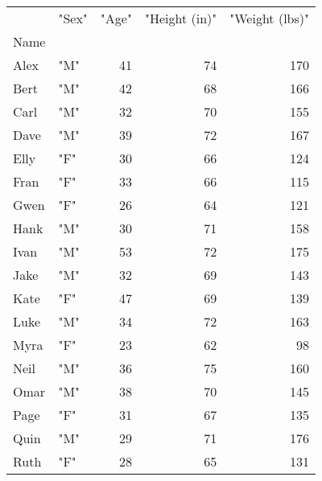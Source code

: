 \begin{tabular}{llrrr}
 &      "Sex" &  "Age" &  "Height (in)" &  "Weight (lbs)" \\
Name &  &  &  &  \\
Alex &        "M" & 41 & 74 & 170 \\
Bert &        "M" & 42 & 68 & 166 \\
Carl &        "M" & 32 & 70 & 155 \\
Dave &        "M" & 39 & 72 & 167 \\
Elly &        "F" & 30 & 66 & 124 \\
Fran &        "F" & 33 & 66 & 115 \\
Gwen &        "F" & 26 & 64 & 121 \\
Hank &        "M" & 30 & 71 & 158 \\
Ivan &        "M" & 53 & 72 & 175 \\
Jake &        "M" & 32 & 69 & 143 \\
Kate &        "F" & 47 & 69 & 139 \\
Luke &        "M" & 34 & 72 & 163 \\
Myra &        "F" & 23 & 62 & 98 \\
Neil &        "M" & 36 & 75 & 160 \\
Omar &        "M" & 38 & 70 & 145 \\
Page &        "F" & 31 & 67 & 135 \\
Quin &        "M" & 29 & 71 & 176 \\
Ruth &        "F" & 28 & 65 & 131 \\
\end{tabular}
